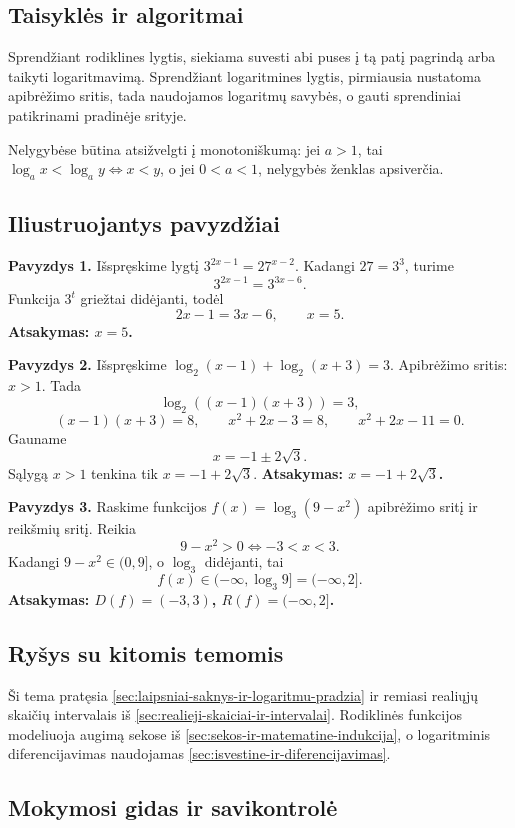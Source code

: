 \subsection{Taisyklės ir algoritmai}

Sprendžiant rodiklines lygtis, siekiama suvesti abi puses į tą patį pagrindą arba taikyti logaritmavimą. Sprendžiant logaritmines lygtis, pirmiausia nustatoma apibrėžimo sritis, tada naudojamos logaritmų savybės, o gauti sprendiniai patikrinami pradinėje srityje.

Nelygybėse būtina atsižvelgti į monotoniškumą: jei $a>1$, tai $\log_a x<\log_a y \iff x<y$, o jei $0<a<1$, nelygybės ženklas apsiverčia.

\subsection{Iliustruojantys pavyzdžiai}

\textbf{Pavyzdys 1.} Išspręskime lygtį $3^{2x-1}=27^{x-2}$. Kadangi $27=3^3$, turime
\[
3^{2x-1}=3^{3x-6}.
\]
Funkcija $3^t$ griežtai didėjanti, todėl
\[
2x-1=3x-6,\qquad x=5.
\]
\textbf{Atsakymas: $x=5$.}

\textbf{Pavyzdys 2.} Išspręskime $\log_2(x-1)+\log_2(x+3)=3$. Apibrėžimo sritis: $x>1$. Tada
\[
\log_2((x-1)(x+3))=3,
\]
\[
(x-1)(x+3)=8,\qquad x^2+2x-3=8,\qquad x^2+2x-11=0.
\]
Gauname
\[
x=-1\pm 2\sqrt3.
\]
Sąlygą $x>1$ tenkina tik $x=-1+2\sqrt3$. \textbf{Atsakymas: $x=-1+2\sqrt3$.}

\textbf{Pavyzdys 3.} Raskime funkcijos $f(x)=\log_3(9-x^2)$ apibrėžimo sritį ir reikšmių sritį. Reikia
\[
9-x^2>0 \iff -3<x<3.
\]
Kadangi $9-x^2\in(0,9]$, o $\log_3$ didėjanti, tai
\[
f(x)\in(-\infty,\log_3 9]=(-\infty,2].
\]
\textbf{Atsakymas: $D(f)=(-3,3)$, $R(f)=(-\infty,2]$.}

\subsection{Ryšys su kitomis temomis}

Ši tema pratęsia \ref{sec:laipsniai-saknys-ir-logaritmu-pradzia} ir remiasi realiųjų skaičių intervalais iš \ref{sec:realieji-skaiciai-ir-intervalai}. Rodiklinės funkcijos modeliuoja augimą sekose iš \ref{sec:sekos-ir-matematine-indukcija}, o logaritminis diferencijavimas naudojamas \ref{sec:isvestine-ir-diferencijavimas}.

\subsection{Mokymosi gidas ir savikontrolė}


